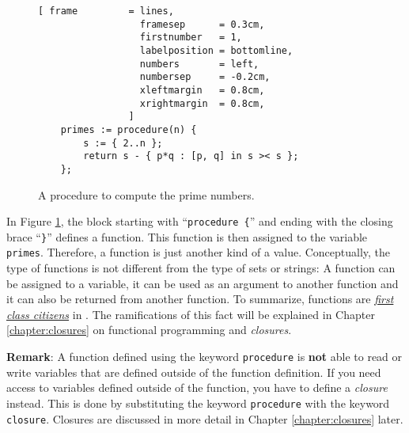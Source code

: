 \begin{figure}[!ht]
\centering
\begin{Verbatim}[ frame         = lines, 
                  framesep      = 0.3cm, 
                  firstnumber   = 1,
                  labelposition = bottomline,
                  numbers       = left,
                  numbersep     = -0.2cm,
                  xleftmargin   = 0.8cm,
                  xrightmargin  = 0.8cm,
                ]
    primes := procedure(n) { 
        s := { 2..n }; 
        return s - { p*q : [p, q] in s >< s }; 
    };
\end{Verbatim}
\vspace*{-0.3cm}
\caption{A procedure to compute the prime numbers.}
\label{fig:primes.stlx}
\end{figure}

In Figure \ref{fig:primes.stlx}, the block starting with ``\texttt{procedure \{}'' and
ending with the closing brace ``\texttt{\}}'' defines a function.  This function is then
assigned to the variable \texttt{primes}.  Therefore, a function is just another kind of a
value.  Conceptually, the type of functions is not different from the type of sets or
strings:  A function can be assigned to a variable, it can be used as an argument to
another function and it can also be returned from another function.  To summarize,
functions are \href{http://en.wikipedia.org/wiki/First-class_function}{\emph{first class citizens}} 
in \setlx.  The ramifications of
this fact will be explained in Chapter \ref{chapter:closures} on functional programming
and \emph{closures}.
\vspace*{0.2cm}

\noindent
\textbf{Remark}:
A function defined using the keyword \texttt{procedure} is \textbf{not} able to read or write
variables that are defined outside of the function definition.  If you need access to variables
defined outside of the function, you have to define a \emph{closure} instead.  This is done by
substituting the keyword \texttt{procedure} with the keyword \texttt{closure}.  Closures are
discussed in more detail in Chapter \ref{chapter:closures} later.



